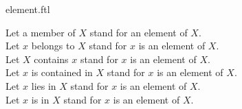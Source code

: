 \documentclass{article}
\begin{document}
\begin{smodule}[creators={Marcel Schütz}]{element.ftl}

  \begin{fconvention*}
    Let a member of $X$ stand for an element of $X$.\\
    Let $x$ belongs to $X$ stand for $x$ is an element of $X$.\\
    Let $X$ contains $x$ stand for $x$ is an element of $X$.\\
    Let $x$ is contained in $X$ stand for $x$ is an element of $X$.\\
    Let $x$ lies in $X$ stand for $x$ is an element of $X$.\\
    Let $x$ is in $X$ stand for $x$ is an element of $X$.
  \end{fconvention*}
\end{smodule}
\end{document}
